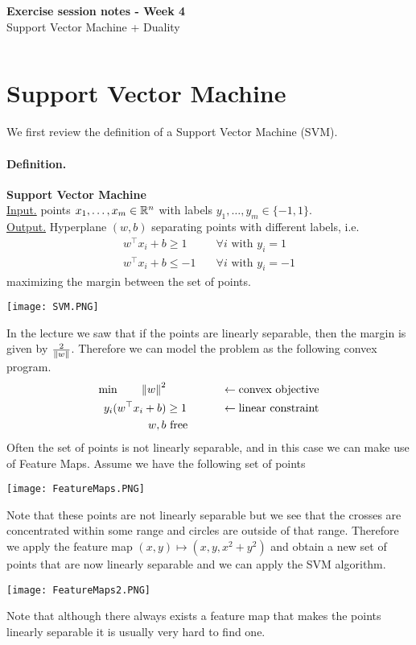 \documentclass[answers]{exam}
\begin{document}
	$ $
	\begin{center}
		\huge \textbf{Exercise session notes - Week 4}  \\ \vspace*{3mm}
        \Large{Support Vector Machine + Duality}
	\end{center}
	$ $\\

    \section{Support Vector Machine}

    We first review the definition of a Support Vector Machine (SVM). 
    \paragraph*{Definition.}
        \textbf{Support Vector Machine} \\
        \underline{Input.} points $x_1,\ldots, x_m\in \mathbb{R}^n$ with labels $y_1,\ldots, y_m\in \{-1,1\}$. \\ 
        \underline{Output.} Hyperplane $(w, b)$ separating points with different labels, i.e.
        \begin{align*}
            w^\top x_i + b \geq 1 \quad&\forall i \text{ with } y_i = 1 \\ 
            w^\top x_i + b \leq -1 \quad&\forall i \text{ with } y_i = -1
        \end{align*}
        maximizing the margin between the set of points.
    \begin{center}
        \texttt{[image: SVM.PNG]}
    \end{center}

    In the lecture we saw that if the points are linearly separable, then the margin is given by $\tfrac{2}{\left\lVert w \right\rVert}$. Therefore we can model the problem as the following convex program.
    \begin{alignat*}{3}
        \min\quad\quad \left\lVert w \right\rVert^2& && \leftarrow \text{convex objective}\\ 
        y_i(w^\top x_i + b) &\geq 1 &&\leftarrow \text{linear constraint}\\ 
        w,b&\text{ free}\quad\quad &&
    \end{alignat*}
    Often the set of points is not linearly separable, and in this case we can make use of Feature Maps. Assume we have the following set of points
    \begin{center}
        \texttt{[image: FeatureMaps.PNG]}
    \end{center}
    Note that these points are not linearly separable but we see that the crosses are concentrated within some range and circles are outside of that range. Therefore we apply the feature map $(x,y)\mapsto (x,y, x^2+y^2)$ and obtain a new set of points that are now linearly separable and we can apply the SVM algorithm.
    \begin{center}
        \texttt{[image: FeatureMaps2.PNG]}
    \end{center}
    Note that although there always exists a feature map that makes the points linearly separable it is usually very hard to find one.
\end{document}
